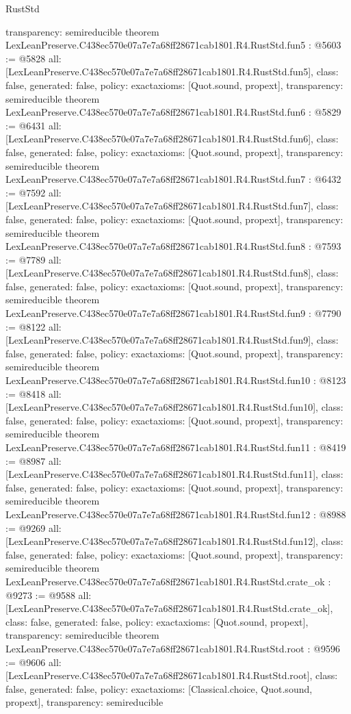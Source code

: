 \begin{lexlean}{RustStd}
\begin{coremodule}
{  transparency: semireducible
}
theorem LexLeanPreserve.C438ec570e07a7e7a68ff28671cab1801.R4.RustStd.fun5 : @5603 := @5828 {
  all: [LexLeanPreserve.C438ec570e07a7e7a68ff28671cab1801.R4.RustStd.fun5],
  class: false,
  generated: false,
  policy: exact{axioms: [Quot.sound, propext]},
  transparency: semireducible
}
theorem LexLeanPreserve.C438ec570e07a7e7a68ff28671cab1801.R4.RustStd.fun6 : @5829 := @6431 {
  all: [LexLeanPreserve.C438ec570e07a7e7a68ff28671cab1801.R4.RustStd.fun6],
  class: false,
  generated: false,
  policy: exact{axioms: [Quot.sound, propext]},
  transparency: semireducible
}
theorem LexLeanPreserve.C438ec570e07a7e7a68ff28671cab1801.R4.RustStd.fun7 : @6432 := @7592 {
  all: [LexLeanPreserve.C438ec570e07a7e7a68ff28671cab1801.R4.RustStd.fun7],
  class: false,
  generated: false,
  policy: exact{axioms: [Quot.sound, propext]},
  transparency: semireducible
}
theorem LexLeanPreserve.C438ec570e07a7e7a68ff28671cab1801.R4.RustStd.fun8 : @7593 := @7789 {
  all: [LexLeanPreserve.C438ec570e07a7e7a68ff28671cab1801.R4.RustStd.fun8],
  class: false,
  generated: false,
  policy: exact{axioms: [Quot.sound, propext]},
  transparency: semireducible
}
theorem LexLeanPreserve.C438ec570e07a7e7a68ff28671cab1801.R4.RustStd.fun9 : @7790 := @8122 {
  all: [LexLeanPreserve.C438ec570e07a7e7a68ff28671cab1801.R4.RustStd.fun9],
  class: false,
  generated: false,
  policy: exact{axioms: [Quot.sound, propext]},
  transparency: semireducible
}
theorem LexLeanPreserve.C438ec570e07a7e7a68ff28671cab1801.R4.RustStd.fun10 : @8123 := @8418 {
  all: [LexLeanPreserve.C438ec570e07a7e7a68ff28671cab1801.R4.RustStd.fun10],
  class: false,
  generated: false,
  policy: exact{axioms: [Quot.sound, propext]},
  transparency: semireducible
}
theorem LexLeanPreserve.C438ec570e07a7e7a68ff28671cab1801.R4.RustStd.fun11 : @8419 := @8987 {
  all: [LexLeanPreserve.C438ec570e07a7e7a68ff28671cab1801.R4.RustStd.fun11],
  class: false,
  generated: false,
  policy: exact{axioms: [Quot.sound, propext]},
  transparency: semireducible
}
theorem LexLeanPreserve.C438ec570e07a7e7a68ff28671cab1801.R4.RustStd.fun12 : @8988 := @9269 {
  all: [LexLeanPreserve.C438ec570e07a7e7a68ff28671cab1801.R4.RustStd.fun12],
  class: false,
  generated: false,
  policy: exact{axioms: [Quot.sound, propext]},
  transparency: semireducible
}
theorem LexLeanPreserve.C438ec570e07a7e7a68ff28671cab1801.R4.RustStd.crate_ok : @9273 := @9588 {
  all: [LexLeanPreserve.C438ec570e07a7e7a68ff28671cab1801.R4.RustStd.crate_ok],
  class: false,
  generated: false,
  policy: exact{axioms: [Quot.sound, propext]},
  transparency: semireducible
}
theorem LexLeanPreserve.C438ec570e07a7e7a68ff28671cab1801.R4.RustStd.root : @9596 := @9606 {
  all: [LexLeanPreserve.C438ec570e07a7e7a68ff28671cab1801.R4.RustStd.root],
  class: false,
  generated: false,
  policy: exact{axioms: [Classical.choice, Quot.sound, propext]},
  transparency: semireducible
}


\end{coremodule}
\end{lexlean}
